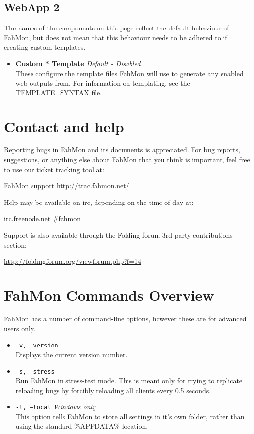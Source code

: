 \subsection{WebApp 2}
The names of the components on this page reflect the default behaviour of
FahMon, but does not mean that this behaviour needs to be adhered to if creating
custom templates.
\begin{itemize}
 \item \textbf{Custom * Template} \textit{Default - Disabled}
  \\These configure the template files FahMon will use to generate any enabled
   web outputs from. For information on templating, see the
\url{TEMPLATE_SYNTAX}
   file.
\end{itemize}

\section{Contact and help}

Reporting bugs in FahMon and its documents is appreciated. For bug reports,
suggestions, or anything else about FahMon that you think is important, feel
free to use our ticket tracking tool at:

\hspace{0.5in}FahMon support \url{http://trac.fahmon.net/}

Help may be available on irc, depending on the time of day at:

\hspace{0.5in}\url{irc.freenode.net} \#\url{fahmon}

Support is also available through the Folding forum 3rd party contributions
section:

\hspace{0.5in}\url{http://foldingforum.org/viewforum.php?f=14}

\appendix

\section{FahMon Commands Overview}

FahMon has a number of command-line options, however these are for advanced
users only.
\begin{itemize}
 \item \texttt{-v, --version}
  \\Displays the current version number.
 \item \texttt{-s, --stress}
  \\Run FahMon in stress-test mode. This is meant only for trying to replicate
   reloading bugs by forcibly reloading all clients every 0.5 seconds.
 \item \texttt{-l, --local} \textit{Windows only}
  \\This option tells FahMon to store all settings in it's own folder, rather
   than using the standard \%APPDATA\% location.
\end{itemize}
